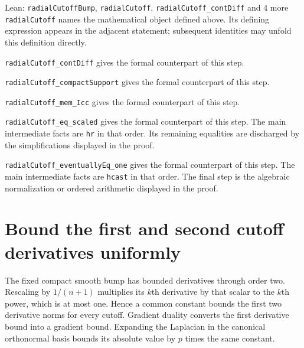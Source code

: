 \documentclass[11pt,a4paper]{article}
\begin{document}
\begin{leanbox}{Lean: \texttt{radialCutoffBump}, \texttt{radialCutoff}, \texttt{radialCutoff\_\allowbreak{}contDiff} and 4 more}
\texttt{radial\allowbreak{}Cutoff} names the mathematical object defined above. Its defining expression appears in the adjacent statement; subsequent identities may unfold this definition directly.




\texttt{radial\allowbreak{}Cutoff\_\allowbreak{}cont\allowbreak{}Diff} gives the formal counterpart of this step.




\texttt{radial\allowbreak{}Cutoff\_\allowbreak{}compact\allowbreak{}Support} gives the formal counterpart of this step.




\texttt{radial\allowbreak{}Cutoff\_\allowbreak{}mem\_\allowbreak{}Icc} gives the formal counterpart of this step.




\texttt{radial\allowbreak{}Cutoff\_\allowbreak{}eq\_\allowbreak{}scaled} gives the formal counterpart of this step. The main intermediate facts are \texttt{hr} in that order. Its remaining equalities are discharged by the simplifications displayed in the proof.




\texttt{radial\allowbreak{}Cutoff\_\allowbreak{}eventually\allowbreak{}Eq\_\allowbreak{}one} gives the formal counterpart of this step. The main intermediate facts are \texttt{hcast} in that order. The final step is the algebraic normalization or ordered arithmetic displayed in the proof.
\end{leanbox}

\section{\texorpdfstring{Bound the first and second cutoff derivatives uniformly}{Bound the first and second cutoff derivatives uniformly}}


The fixed compact smooth bump has bounded derivatives through order two. Rescaling by \(1/(n+1)\) multiplies its \(k\)th derivative by that scalar to the \(k\)th power, which is at most one. Hence a common constant bounds the first two derivative norms for every cutoff. Gradient duality converts the first derivative bound into a gradient bound. Expanding the Laplacian in the canonical orthonormal basis bounds its absolute value by \(p\) times the same constant.
\end{document}

